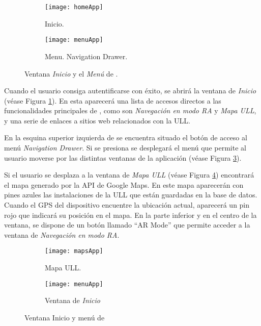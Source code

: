 \begin{figure}[h]
    \hspace*{\fill}%
    \begin{subfigure}[h]{0.35\linewidth}
    \texttt{[image: homeApp]}
    \caption{Inicio.}
    \label{fig:homeApp}
    \end{subfigure} 
    \hfill%
    \begin{subfigure}[h]{0.35\linewidth}
    \texttt{[image: menuApp]}
    \caption{Menu. Navigation Drawer.}
    \label{fig:menuApp}
    \end{subfigure}
    \caption{Ventana \textit{Inicio} y el \textit{Menú} de \textit{\ULLAR{}}.}
    \hspace*{\fill}
\end{figure}

Cuando el usuario consiga autentificarse con éxito, se abrirá la ventana de \textit{Inicio} (véase Figura \ref{fig:homeApp}). En esta aparecerá una lista de accesos directos a las funcionalidades principales de \ULLAR{}, como son \textit{Navegación en modo RA} y \textit{Mapa ULL}, y una serie de enlaces a sitios web relacionados con la ULL.

En la esquina superior izquierda de \ULLAR{} se encuentra situado el botón de acceso al menú \textit{Navigation Drawer}. Si se presiona se desplegará el menú que permite al usuario moverse por las distintas ventanas de la aplicación (véase Figura \ref{fig:menuApp}).

Si el usuario se desplaza a la ventana de \textit{Mapa ULL} (véase Figura \ref{fig:mapsApp}) encontrará el mapa generado por la API de Google Maps. En este mapa aparecerán con pines azules las instalaciones de la ULL que están guardadas en la base de datos. Cuando el GPS del dispositivo encuentre la ubicación actual, aparecerá un pin rojo que indicará su posición en el mapa. En la parte inferior y en el centro de la ventana, se dispone de un botón llamado ``AR Mode'' que permite acceder a la ventana de \textit{Navegación en modo RA}.
  
\begin{figure}[h]
    \hspace*{\fill}%
    \begin{subfigure}[h]{0.37\linewidth}
        \texttt{[image: mapsApp]}
        \caption{Mapa ULL.}
        \label{fig:mapsApp}
    \end{subfigure}
    \hfill%
    \begin{subfigure}[h]{0.37\linewidth}
        \texttt{[image: menuApp]}
        \caption{Ventana de \textit{Inicio}}
        \label{fig:menussApp}
    \end{subfigure}%
    \caption{Ventana Inicio y menú de \textit{\ULLAR{}}}
    \hspace*{\fill}%
\end{figure}

